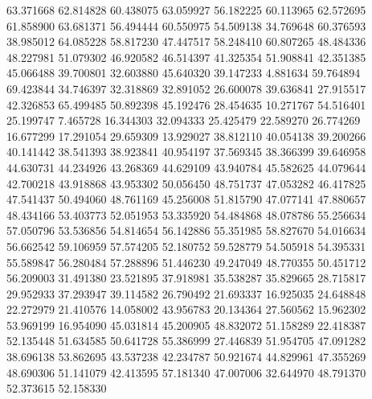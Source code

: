63.371668
62.814828
60.438075
63.059927
56.182225
60.113965
62.572695
61.858900
63.681371
56.494444
60.550975
54.509138
34.769648
60.376593
38.985012
64.085228
58.817230
47.447517
58.248410
60.807265
48.484336
48.227981
51.079302
46.920582
46.514397
41.325354
51.908841
42.351385
45.066488
39.700801
32.603880
45.640320
39.147233
4.881634
59.764894
69.423844
34.746397
32.318869
32.891052
26.600078
39.636841
27.915517
42.326853
65.499485
50.892398
45.192476
28.454635
10.271767
54.516401
25.199747
7.465728
16.344303
32.094333
25.425479
22.589270
26.774269
16.677299
17.291054
29.659309
13.929027
38.812110
40.054138
39.200266
40.141442
38.541393
38.923841
40.954197
37.569345
38.366399
39.646958
44.630731
44.234926
43.268369
44.629109
43.940784
45.582625
44.079644
42.700218
43.918868
43.953302
50.056450
48.751737
47.053282
46.417825
47.541437
50.494060
48.761169
45.256008
51.815790
47.077141
47.880657
48.434166
53.403773
52.051953
53.335920
54.484868
48.078786
55.256634
57.050796
53.536856
54.814654
56.142886
55.351985
58.827670
54.016634
56.662542
59.106959
57.574205
52.180752
59.528779
54.505918
54.395331
55.589847
56.280484
57.288896
51.446230
49.247049
48.770355
50.451712
56.209003
31.491380
23.521895
37.918981
35.538287
35.829665
28.715817
29.952933
37.293947
39.114582
26.790492
21.693337
16.925035
24.648848
22.272979
21.410576
14.058002
43.956783
20.134364
27.560562
15.962302
53.969199
16.954090
45.031814
45.200905
48.832072
51.158289
22.418387
52.135448
51.634585
50.641728
55.386999
27.446839
51.954705
47.091282
38.696138
53.862695
43.537238
42.234787
50.921674
44.829961
47.355269
48.690306
51.141079
42.413595
57.181340
47.007006
32.644970
48.791370
52.373615
52.158330
